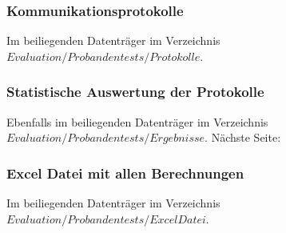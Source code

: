 \documentclass[
	12pt,
	a4paper,
	bibtotoc,
	cleardoubleempty, 
	idxtotoc,
	ngerman,
	openright
	final,
	listof=nochaptergap,
	]{scrbook}
\begin{document}
\begin{appendices}
\subsubsection{Kommunikationsprotokolle}\label{sec:append_study_protocols}
Im beiliegenden Datenträger im Verzeichnis $Evaluation/Probandentests/Protokolle$. 

\subsubsection{Statistische Auswertung der Protokolle}
Ebenfalls im beiliegenden Datenträger im Verzeichnis $Evaluation/Probandentests/Ergebnisse$. 
Nächste Seite:



\subsubsection{Excel Datei mit allen Berechnungen}
Im beiliegenden Datenträger im Verzeichnis $Evaluation/Probandentests/Excel Datei$. 



% 
% 
\end{appendices}
\end{document}
